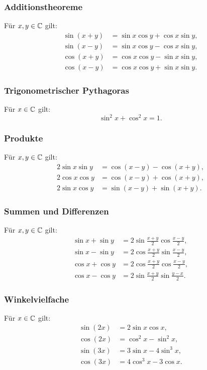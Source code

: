 \subsubsection{Additionstheoreme}

Für $x,y\in\mathbb C$ gilt:
\begin{align}
\sin(x+y) &= \sin x\cos y+\cos x\sin y,\\
\sin(x-y) &= \sin x\cos y-\cos x\sin y,\\
\cos(x+y) &= \cos x\cos y-\sin x\sin y,\\
\cos(x-y) &= \cos x\cos y+\sin x\sin y.
\end{align}

\subsubsection{Trigonometrischer Pythagoras}
Für $x\in\mathbb C$ gilt:
\begin{equation}
\sin^2 x+\cos^2 x=1.
\end{equation}

\subsubsection{Produkte}
Für $x,y\in\mathbb C$ gilt:
\begin{align}
2\sin x\sin y &= \cos(x-y)-\cos(x+y),\\
2\cos x\cos y &= \cos(x-y)+\cos(x+y),\\
2\sin x\cos y &= \sin(x-y)+\sin(x+y).
\end{align}

\subsubsection{Summen und Differenzen}
Für $x,y\in\mathbb C$ gilt:
\begin{align}
\sin x+\sin y &= 2\sin\frac{x+y}{2}\cos\frac{x-y}{2},\\
\sin x-\sin y &= 2\cos\frac{x+y}{2}\sin\frac{x-y}{2},\\
\cos x+\cos y &= 2\cos\frac{x+y}{2}\cos\frac{x-y}{2},\\
\cos x-\cos y &= 2\sin\frac{x+y}{2}\sin\frac{y-x}{2}.
\end{align}

\subsubsection{Winkelvielfache}
Für $x\in\mathbb C$ gilt:
\begin{align}
\sin(2x) &= 2\sin x\cos x,\\
\cos(2x) &= \cos^2 x-\sin^2 x,\\
\sin(3x) &= 3\sin x-4\sin^3 x,\\
\cos(3x) &= 4\cos^3 x-3\cos x.
\end{align}

